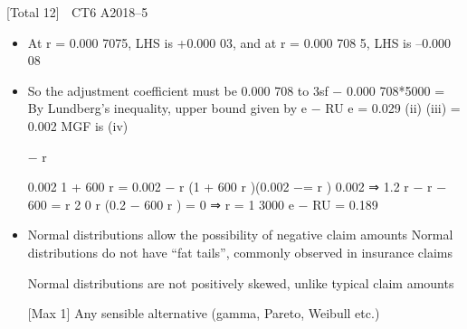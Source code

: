 \documentclass[a4paper,12pt]{article}
\begin{document}
[Total 12]

CT6 A2018–5 
\newpage
\begin{itemize}
(i)
r is the unique positive root of the equation:
\[\lambda + cr = \lambda M X ( r )\]

c 1.2 \lambda E ( X ) , so the equation simplifies to
Here =
1 + 1.2 E ( X ) r =
M X ( r )

Page 8 %
M X ( r ) =
1
\mu r +  r 2
e 2
(from tables)

E ( X ) = 500 (from question)
So 1 + 600 r
1
500 r + 200 r 2
2
− e

= 0

\item At r = 0.000 7075, LHS is +0.000 03, and at r = 0.000 708 5, LHS is
–0.000 08

\item So the adjustment coefficient must be 0.000 708 to 3sf
− 0.000 708*5000
=
By Lundberg’s inequality, upper bound given
by e − RU e =
0.029
(ii)
(iii)
\lambda = 0.002
MGF is
(iv)


\lambda
\lambda − r

0.002
1 + 600 r =
0.002 − r 
(1 + 600 r )(0.002 −=
r ) 0.002 ⇒ 1.2 r − r − 600 =
r 2 0 
r (0.2 − 600 r ) = 0 ⇒ r = 1 
3000
e − RU = 0.189 
\item Normal distributions allow the possibility of negative claim amounts  Normal distributions do not have “fat tails”, commonly observed in insurance
claims

Normal distributions are not positively skewed, unlike typical claim amounts

[Max 1]
Any sensible alternative (gamma, Pareto, Weibull etc.)


\end{itemize}
\end{document}
